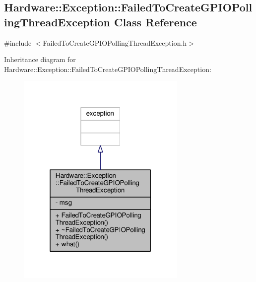 \hypertarget{class_hardware_1_1_exception_1_1_failed_to_create_g_p_i_o_polling_thread_exception}{}\subsection{Hardware\+:\+:Exception\+:\+:Failed\+To\+Create\+G\+P\+I\+O\+Polling\+Thread\+Exception Class Reference}
\label{class_hardware_1_1_exception_1_1_failed_to_create_g_p_i_o_polling_thread_exception}


{\ttfamily \#include $<$Failed\+To\+Create\+G\+P\+I\+O\+Polling\+Thread\+Exception.\+h$>$}



Inheritance diagram for Hardware\+:\+:Exception\+:\+:Failed\+To\+Create\+G\+P\+I\+O\+Polling\+Thread\+Exception\+:
\nopagebreak
\begin{figure}[H]
\begin{center}
\leavevmode
\includegraphics[width=232pt]{class_hardware_1_1_exception_1_1_failed_to_create_g_p_i_o_polling_thread_exception__inherit__graph}
\end{center}
\end{figure}


